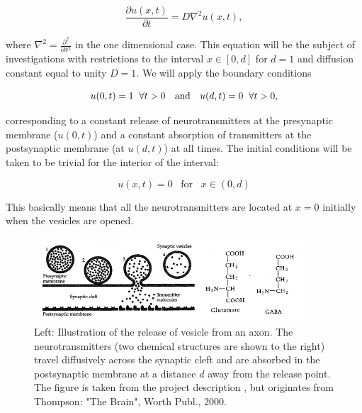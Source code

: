 \documentclass[a4paper, 11pt, notitlepage,english]{article}
\begin{document}
\begin{equation}
\frac{\partial u(x,t)}{\partial t} = D \nabla^2 u(x,t),
\label{eq:Diffusion_eq}
\end{equation}

where $\nabla^2 = \frac{\partial^2}{\partial x^2}$ in the one dimensional case. This equation will be the subject of investigations with restrictions to the interval $x\in [0,d]$ for $d=1$ and diffusion constant equal to unity $D=1$. We will apply the boundary conditions

\begin{equation}
u(0,t) = 1 \hspace{2mm} \forall t > 0 \hspace{10pt} \mathrm{and} \hspace{10pt} u(d,t) = 0 \hspace{2mm} \forall t > 0,
\label{eq:Boundary_condition}
\end{equation}

corresponding to a constant release of neurotransmitters at the presynaptic membrane ($u(0,t)$) and a constant absorption of transmitters at the postsynaptic membrane (at $u(d,t)$) at all times. The initial conditions will be taken to be trivial for the interior of the interval:

\begin{equation}
u(x,t) = 0 \hspace{10pt} \mathrm{for} \hspace{10pt} x\in(0,d) 
\label{eq:Initial_conditions}
\end{equation}

This basically means that all the neurotransmitters are located at $x=0$ initially when the vesicles are opened. \\

\begin{figure}[h!tb]
 \centering
 \includegraphics[width=0.9\textwidth]{Synaptic_cleft_project}
 \caption{Left: Illustration of the release of vesicle from an axon. The neurotransmitters (two chemical structures are shown to the right) travel diffusively across the synaptic cleft and are absorbed in the postsynaptic membrane at a distance $d$ away from the release point. The figure is taken from the project description \cite{Komp3150}, but originates from Thompson: "The Brain", Worth Publ., 2000.}
\label{fig:Synaptic_cleft}
\end{figure}
\end{document}
